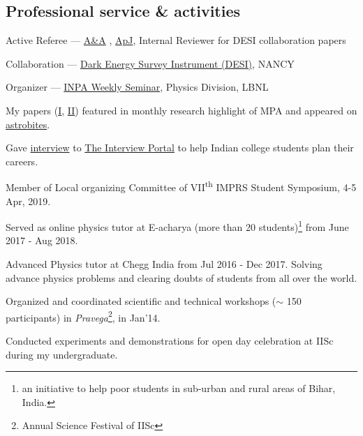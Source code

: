 \documentclass[12pt,letterpaper]{article}
\begin{document}

\subsection{Professional service \& activities}
\begin{list}{}{\cvlist}
    \item Active Referee ---
    \href{https://en.wikipedia.org/wiki/Astronomy_%26_Astrophysics}{A\&A}
    , \href{https://en.wikipedia.org/wiki/The_Astrophysical_Journal}{ApJ}, Internal Reviewer for DESI collaboration papers
    \item Collaboration ---
        \href{https://www.desi.lbl.gov/}{Dark Energy Survey Instrument (DESI)}, NANCY
    \item Organizer ---
        \href{https://inpa.lbl.gov/events/}{INPA Weekly Seminar}, Physics Division, LBNL
    \item My papers (\href{https://www.mpa-garching.mpg.de/964620/hl202107}{I}, \href{https://www.mpa-garching.mpg.de/1066558/hl202211?c=27981}{II}) featured in monthly research highlight of MPA and appeared on \href{https://astrobites.org/2021/05/06/cool-metal-gas-search-thanks-it-was-automated/}{astrobites}.
    \item Gave \href{https://theinterviewportal.com/2020/03/13/astrophysicist-interview-8/}{interview} to \href{https://theinterviewportal.com/}{The Interview Portal} to help Indian college students plan their careers. 
    \item Member of Local organizing Committee of VII\textsuperscript{th} IMPRS Student Symposium, 4-5 Apr, 2019.
  \item Served as online physics tutor at E-acharya (more than 20 students)\footnote{an initiative to help poor students in sub-urban and rural areas of Bihar, India.} from June 2017 - Aug 2018.
    \item Advanced Physics tutor at Chegg India from Jul 2016 - Dec 2017. Solving advance physics problems and clearing doubts of students from all over the world.
  \item Organized and coordinated scientific and technical workshops ($\sim$ 150 participants) in \emph{Pravega}\footnote{Annual Science Festival of IISc}, in Jan'14.
    \item Conducted experiments and demonstrations for open day celebration at IISc during my undergraduate.
\end{list}
\end{document}
